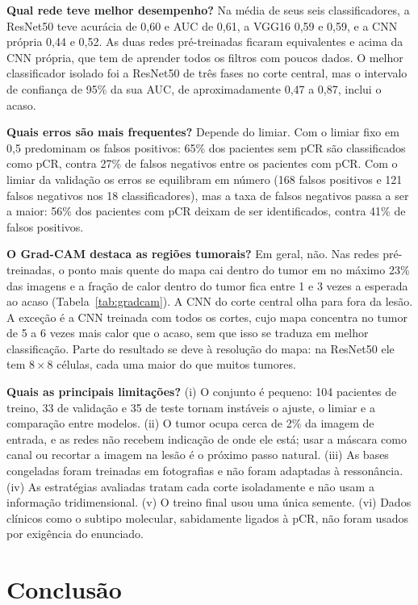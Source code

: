 \documentclass[12pt]{article}
\begin{document}
\textbf{Qual rede teve melhor desempenho?} Na média de seus seis classificadores, a ResNet50 teve
acurácia de 0,60 e AUC de 0,61, a VGG16 0,59 e 0,59, e a CNN própria 0,44 e 0,52. As duas redes
pré-treinadas ficaram equivalentes e acima da CNN própria, que tem de aprender todos os filtros com
poucos dados. O melhor classificador isolado foi a ResNet50 de três fases no corte central, mas o
intervalo de confiança de 95\% da sua AUC, de aproximadamente 0,47 a 0,87, inclui o acaso.

\textbf{Quais erros são mais frequentes?} Depende do limiar. Com o limiar fixo em 0,5 predominam os
falsos positivos: 65\% dos pacientes sem pCR são classificados como pCR, contra 27\% de falsos negativos
entre os pacientes com pCR. Com o limiar da validação os erros se equilibram em número (168 falsos
positivos e 121 falsos negativos nos 18 classificadores), mas a taxa de falsos negativos passa a ser a
maior: 56\% dos pacientes com pCR deixam de ser identificados, contra 41\% de falsos positivos.

\textbf{O Grad-CAM destaca as regiões tumorais?} Em geral, não. Nas redes pré-treinadas, o ponto mais
quente do mapa cai dentro do tumor em no máximo 23\% das imagens e a fração de calor dentro do tumor
fica entre 1 e 3 vezes a esperada ao acaso (Tabela~\ref{tab:gradcam}). A CNN do corte central olha para
fora da lesão. A exceção é a CNN treinada com todos os cortes, cujo mapa concentra no tumor de 5 a 6
vezes mais calor que o acaso, sem que isso se traduza em melhor classificação. Parte do resultado se deve
à resolução do mapa: na ResNet50 ele tem $8 \times 8$ células, cada uma maior do que muitos tumores.

\textbf{Quais as principais limitações?} (i) O conjunto é pequeno: 104 pacientes de treino, 33 de
validação e 35 de teste tornam instáveis o ajuste, o limiar e a comparação entre modelos. (ii) O tumor
ocupa cerca de 2\% da imagem de entrada, e as redes não recebem indicação de onde ele está; usar a
máscara como canal ou recortar a imagem na lesão é o próximo passo natural. (iii) As bases congeladas
foram treinadas em fotografias e não foram adaptadas à ressonância. (iv) As estratégias avaliadas tratam
cada corte isoladamente e não usam a informação tridimensional. (v) O treino final usou uma única
semente. (vi) Dados clínicos como o subtipo molecular, sabidamente ligados à pCR, não foram usados por
exigência do enunciado.

\section{Conclusão}
\end{document}
